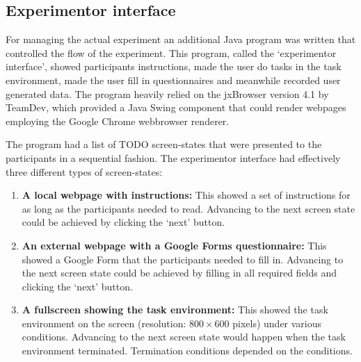 \subsection{Experimentor interface}

For managing the actual experiment an additional Java program was written that controlled the flow of the experiment. This program, called the `experimentor interface', showed participants instructions, made the user do tasks in the task environment, made the user fill in questionnaires and meanwhile recorded user generated data. The program heavily relied on the jxBrowser version 4.1 by TeamDev, which provided a Java Swing component that could render webpages employing the Google Chrome webbrowser renderer. 

The program had a list of TODO screen-states that were presented to the participants in a sequential fashion. The experimentor interface had effectively three different types of screen-states:
\begin{enumerate}
	\item{\textbf{A local webpage with instructions:}} This showed a set of instructions for as long as the participants needed to read. Advancing to the next screen state could be achieved by clicking the `next' button.
	\item{\textbf{An external webpage with a Google Forms questionnaire:}} This showed a Google Form that the participants needed to fill in. Advancing to the next screen state could be achieved by filling in all required fields and clicking the `next' button.
	\item{\textbf{A fullscreen showing the task environment:}} This showed the task environment on the screen (resolution: $800 \times 600$ pixels) under various conditions. Advancing to the next screen state would happen when the task environment terminated. Termination conditions depended on the conditions.
\end{enumerate}



